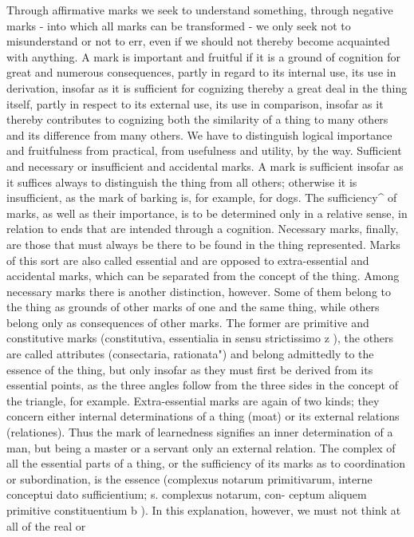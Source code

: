 Through affirmative marks we seek to understand something, through
negative marks - into which all marks can be transformed - we only seek
not to misunderstand or not to err, even if we should not thereby become
acquainted with anything.
A mark is important and fruitful if it is a ground of cognition for great
and numerous consequences, partly in regard to its internal use, its use in
derivation, insofar as it is sufficient for cognizing thereby a great deal in
the thing itself, partly in respect to its external use, its use in comparison,
insofar as it thereby contributes to cognizing both the similarity of a thing
to many others and its difference from many others.
We have to distinguish logical importance and fruitfulness from practical,
from usefulness and utility, by the way.
Sufficient
and necessary or insufficient
and accidental marks.
A mark is sufficient insofar as it suffices always to distinguish the thing
from all others; otherwise it is insufficient, as the mark of barking is, for
example, for dogs. The sufficiency^ of marks, as well as their importance,
is to be determined only in a relative sense, in relation to ends that are
intended through a cognition.
Necessary marks, finally, are those that must always be there to be found
in the thing represented. Marks of this sort are also called essential and are
opposed to extra-essential and accidental marks, which can be separated
from the concept of the thing.
Among necessary marks there is another distinction, however.
Some of them belong to the thing as grounds of other marks of one and
the same thing, while others belong only as consequences of other marks.
The former are primitive and constitutive marks (constitutiva, essentialia in
sensu strictissimo z ), the others are called attributes (consectaria, rationata")
and belong admittedly to the essence of the thing, but only insofar as they
must first be derived from its essential points, as the three angles follow
from the three sides in the concept of the triangle, for example.
Extra-essential marks are again of two kinds; they concern either internal
determinations of a thing (moat) or its external relations (relationes). Thus
the mark of learnedness signifies an inner determination of a man, but being
a master or a servant only an external relation.
The complex of all the essential parts of a thing, or the sufficiency of its
marks as to coordination or subordination, is the essence (complexus notarum
primitivarum, interne conceptui dato sufficientium; s. complexus notarum, con-
ceptum aliquem primitive constituentium b ).
In this explanation, however, we must not think at all of the real or

